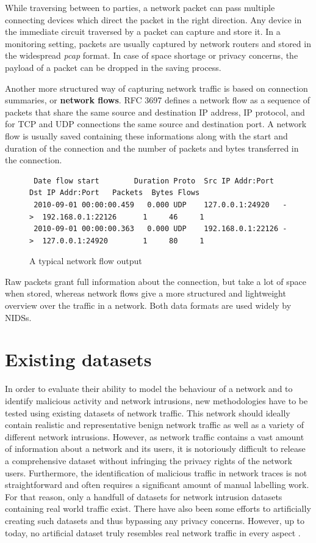 \documentclass[a4paper,12pt,twoside]{report}
\begin{document}
While traversing between to parties, a network packet can pass multiple connecting devices which direct the packet in the right direction. Any device in the immediate circuit traversed by a packet can capture and store it. In a monitoring setting, packets are usually captured by network routers and stored in the widespread \textit{pcap} format. In case of space shortage or privacy concerns, the payload of a packet can be dropped in the saving process.


Another more structured way of capturing network traffic is based on connection summaries, or \textbf{network flows}. RFC 3697 \cite{brownlee1999traffic} defines a network flow as a sequence of packets that share the same source and destination IP address, IP protocol, and for TCP and UDP connections the same source and destination port. A network flow is usually saved containing these informations along with the start and duration of the connection and the number of packets and bytes transferred in the connection.


\begin{figure}[h!]
\scriptsize
\centering
\begin{verbatim}
 Date flow start        Duration Proto  Src IP Addr:Port      Dst IP Addr:Port   Packets  Bytes Flows
 2010-09-01 00:00:00.459   0.000 UDP    127.0.0.1:24920   ->  192.168.0.1:22126      1     46     1
 2010-09-01 00:00:00.363   0.000 UDP    192.168.0.1:22126 ->  127.0.0.1:24920        1     80     1
\end{verbatim}
\normalsize
\caption{A typical network flow output}
\end{figure}


Raw packets grant full information about the connection, but take a lot of space when stored, whereas network flows give a more structured and lightweight overview over the traffic in a network. Both data formats are used widely by NIDSs.

\section{Existing datasets}

In order to evaluate their ability to model the behaviour of a network and to identify malicious activity and network intrusions, new methodologies have to be tested using existing datasets of network traffic. This network should ideally contain realistic and representative benign network traffic as well as a variety of different network intrusions. However, as  network traffic contains a vast amount of information about a network and its users, it is notoriously difficult to release a comprehensive dataset without infringing the privacy rights of the network users. 
Furthermore, the identification of malicious traffic in network traces is not straightforward and often requires a significant amount of manual labelling work.
For that reason, only a handfull of datasets for network intrusion datasets containing real world traffic exist. There have also been some efforts to artificially creating such datasets and thus bypassing any privacy concerns. However, up to today, no artificial dataset truly resembles real network traffic in every aspect \cite{nisioti2018intrusion}.
\end{document}
